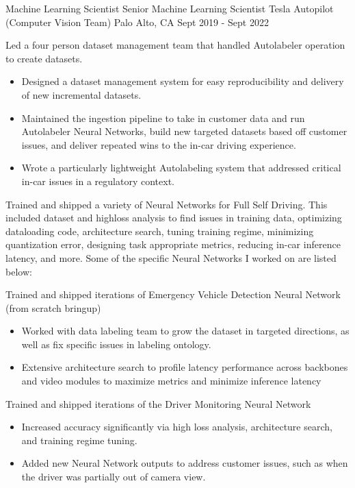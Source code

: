 \begin{cventries}
	\cventry
	{Machine Learning Scientist \rightarrow \; Senior Machine Learning Scientist}
	{Tesla Autopilot (Computer Vision Team)}
	{Palo Alto, CA}
	{Sept 2019 - Sept 2022}
	{
		\begin{cvitems}
			\item Led a four person dataset management team that handled Autolabeler operation to create datasets.
			\begin{itemize}
				\item Designed a dataset management system for easy reproducibility and delivery of new incremental datasets.
				\item Maintained the ingestion pipeline to take in customer data and run Autolabeler Neural Networks, build new targeted datasets
        			based off customer issues, and deliver repeated wins to the in-car driving experience.
				\item Wrote a particularly lightweight Autolabeling system that addressed critical in-car issues in a regulatory context.
			\end{itemize}
			\item Trained and shipped a variety of Neural Networks for Full Self Driving. This included dataset and highloss analysis to find issues in
      			training data, optimizing dataloading code, architecture search, tuning training regime, minimizing quantization error,
      			designing task appropriate metrics, reducing in-car inference latency, and more. Some of the specific Neural Networks I worked on are listed below:
			\item Trained and shipped iterations of Emergency Vehicle Detection Neural Network (from scratch bringup)
			\begin{itemize}
				\item Worked with data labeling team to grow the dataset in targeted directions, as well as fix specific issues in labeling ontology.
				\item Extensive architecture search to profile latency performance across backbones and video modules to maximize metrics and minimize inference latency
			\end{itemize}
			\item Trained and shipped iterations of the Driver Monitoring Neural Network
			\begin{itemize}
				\item Increased accuracy significantly via high loss analysis, architecture search, and training regime tuning.
				\item Added new Neural Network outputs to address customer issues, such as when the driver was partially out of camera view.

\end{itemize}
\end{cvitems}}
\end{cventries}
